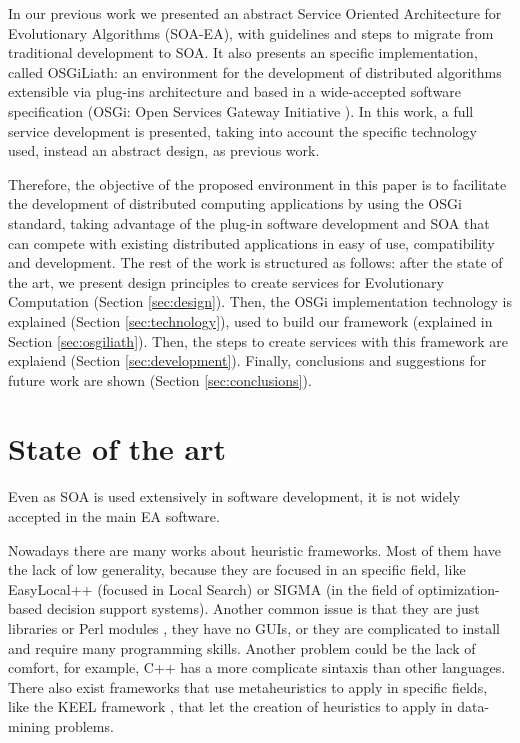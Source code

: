 \documentclass{sig-alternate}
\begin{document}
In our previous work \cite{OSGILIATH} we presented an abstract Service Oriented Architecture for Evolutionary Algorithms (SOA-EA), with guidelines and steps to migrate from traditional development to SOA. It also presents an specific implementation, called OSGiLiath: an environment for the development of distributed algorithms extensible via plug-ins architecture and based in a wide-accepted software specification (OSGi: Open Services Gateway Initiative \cite{OSGI}). In this work, a full service development is presented, taking into account the specific technology used, instead an abstract design, as previous work.

Therefore, the objective of the proposed environment in this paper is to facilitate the
development of distributed computing applications by using the OSGi standard,
taking advantage
of the plug-in software development and SOA that can compete with existing
distributed applications in easy of use, compatibility and development.
The rest of the work is structured as follows: after the state of
the art, we present design principles to create services for Evolutionary Computation (Section \ref{sec:design}). Then, the OSGi implementation technology is explained (Section \ref{sec:technology}), used to build our framework (explained in Section \ref{sec:osgiliath}). Then, the steps to create services with this framework are explaiend (Section \ref{sec:development}). Finally, conclusions and suggestions for future work are shown (Section \ref{sec:conclusions}).


%
\section{State of the art}
\label{sec:soa}
%
Even as SOA is used extensively in software development, it is not widely accepted in the main EA software. 

Nowadays there are many works about heuristic
frameworks. Most of them have the lack of low generality, because they
are focused in an specific field, like EasyLocal++ \cite{EASYLOCAL} (focused in Local Search) or
SIGMA \cite{SIGMA} (in the field of optimization-based decision support systems). Another common issue is that they are just libraries
 or Perl modules \cite{PERL}, they have no GUIs, or they are complicated to
install and require many programming skills. Another problem could be
the lack of comfort, for example, C++ has a more complicate sintaxis
than other languages. There also exist frameworks that use metaheuristics to apply in specific fields, like the KEEL framework \cite{KEEL}, that let the creation of heuristics to apply in data-mining problems.
\end{document}
